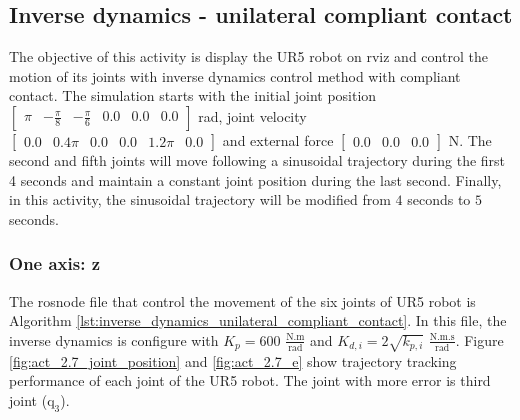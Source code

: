 \subsection{Inverse dynamics - unilateral compliant contact}
The objective of this activity is display the UR5 robot on rviz and control the motion of its joints with inverse dynamics control method with compliant contact. The simulation starts with the initial joint position $\begin{bmatrix} \pi & -\frac{\pi}{8} & -\frac{\pi}{6} & 0.0 & 0.0 & 0.0 \end{bmatrix}$ rad, joint velocity $\begin{bmatrix} 0.0 & 0.4\pi & 0.0 & 0.0 & 1.2\pi & 0.0 \end{bmatrix}$ and external force $\begin{bmatrix} 0.0 & 0.0 & 0.0 \end{bmatrix}$ N. The second and fifth joints will move following a sinusoidal trajectory during the first 4 seconds and maintain a constant joint position during the last second. Finally, in this activity, the sinusoidal trajectory will be modified from $4$ seconds to $5$ seconds.

\subsubsection{One axis: z}
The rosnode file that control the movement of the six joints of UR5 robot is Algorithm \ref{lst:inverse_dynamics_unilateral_compliant_contact}. In this file, the inverse dynamics is configure with $K_p=600$ $\mathrm{\frac{N.m}{rad}}$ and $K_{d,i}=2\sqrt{k_{p,i}}$ $\mathrm{\frac{N.m.s}{rad}}$. Figure \ref{fig:act_2.7_joint_position} and \ref{fig:act_2.7_e} show trajectory tracking performance of each joint of the UR5 robot. The joint with more error is third joint ($\mathrm{q}_3$).

